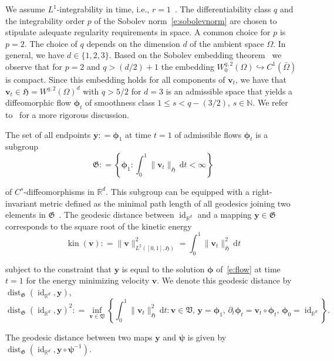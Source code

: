 \documentclass[11pt]{amsart}
\newcommand\fs[1]{\ensuremath{\mathfrak{#1}}}
\newcommand{\defeq}{\ensuremath{\mathrel{\mathop:}=}}
\renewcommand{\d}{\ensuremath{\text{d}}}
\renewcommand{\vec}[1]{\ensuremath{\boldsymbol{#1}}}
\begin{document}
We assume $L^1$-integrability in time, i.e., $r = 1$~\cite{Younes:2019a}. The differentiability class $q$ and the integrability order $p$ of the Sobolev norm~\eqref{e:sobolevnorm} are chosen to stipulate adequate regularity requirements in space. A common choice for $p$ is $p = 2$. The choice of $q$ depends on the dimension $d$ of the ambient space $\Omega$. In general, we have $d\in\{1,2,3\}$. Based on the Sobolev embedding theorem~\cite{Ziemer:1989a} we observe that for $p=2$ and $q > (d/2) + 1$ the embedding $W^{q,2}_0(\Omega) \hookrightarrow C^1(\bar{\Omega})$ is compact. Since this embedding holds for all components of $\vec{v}_t$, we have that $\vec{v}_t \in \fs{H} = W^{q,2}(\Omega)^d$ with $q > 5/2$ for $d=3$ is an admissible space that yields a diffeomorphic flow $\vec{\phi}_t$ of smoothness class $1 \leq s < q - (3/2)$, $s \in \mathbb{N}$. We refer to~\cite{Dupuis:1998a,Glaunes:2008a,Younes:2019a} for a more rigorous discussion.

The set of all endpoints $\vec{y} \defeq \vec{\phi}_1$ at time $t=1$ of admissible flows $\vec{\phi}_t$ is a subgroup
\[
\fs{G} \defeq \left\{ \vec{\phi}_1 : \int_0^1 \!\!\|\vec{v}_t\|_{\fs{H}} \,\d t < \infty\right\}
\]

\noindent of $C^s$-diffeomorphisms in $\mathbb{R}^d$. This subgroup can be equipped with a right-invariant metric defined as the minimal path length of all geodesics joining two elements in $\fs{G}$~\cite{Trouve:1995a,Miller:2002a,Younes:2020a,Bauer:2014a}. The geodesic distance between $\operatorname{id}_{\mathbb{R}^d}$ and a mapping $\vec{y} \in \fs{G}$ corresponds to the square root of the kinetic energy
\begin{equation}\label{e:kinv}
\operatorname{kin}(\vec{v})
\defeq
\| \vec{v} \|_{L^2([0,1],\fs{H})}^2
=
\int_0^1 \| \vec{v}_t \|_{\fs{H}}^2 \,\d t
\end{equation}

\noindent subject to the constraint that $\vec{y}$ is equal to the solution $\vec{\phi}$ of~\eqref{e:flow} at time $t=1$ for the energy minimizing velocity $\vec{v}$. We denote this geodesic distance by $\operatorname{dist}_{\fs{G}}(\operatorname{id}_{\mathbb{R}^d},\vec{y})$,
\[
\operatorname{dist}_{\fs{G}}(\operatorname{id}_{\mathbb{R}^d},\vec{y})^2 \defeq \inf_{\vec{v} \in \fs{V}}
\left\{
\int_0^1 \!\!\| \vec{v}_t \|^2_{\fs{H}} \,\d t
: \vec{v} \in \fs{V}, \,
\vec{y} = \vec{\phi}_1,\,
\partial_t \vec{\phi}_t = \vec{v}_t\circ\vec{\phi}_t,\,
\vec{\phi}_0 = \operatorname{id}_{\mathbb{R}^d}
\right\}.
\]

\noindent The geodesic distance between two maps $\vec{y}$ and $\vec{\psi}$ is given by $\operatorname{dist}_{\fs{G}}(\operatorname{id}_{\mathbb{R}^d},\vec{y}\circ\vec{\psi}^{-1})$.
\end{document}
